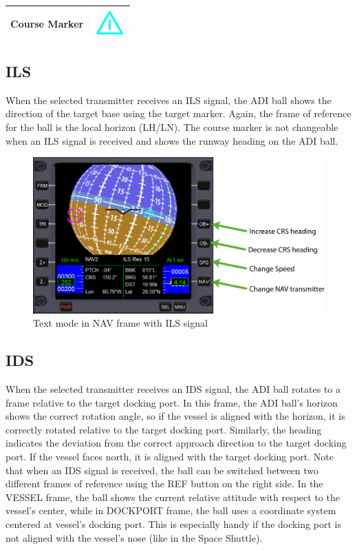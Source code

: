 \documentclass[paper=a4, 11 pt]{report}
\begin{document}
\renewcommand{\arraystretch}{2.7}
\begin{center}
\begin{tabular}{ |c  c | }
  \hline
  Course Marker & \includegraphics[scale=.5]{crs.png} \\ \hline
\end{tabular}
\end{center}

\subsection{ILS}
When the selected transmitter receives an ILS signal, the ADI ball shows the direction of the target base using the target marker.
Again, the frame of reference for the ball is the local horizon (LH/LN).
The course marker is not changeable when an ILS signal is received and shows the runway heading on the ADI ball.

\begin{figure}[h]
	\centering
	\includegraphics[width=\textwidth]{3_ils.pdf}
	\caption{Text mode in NAV frame with ILS signal}
	\label{fig:ils}
\end{figure}

\subsection{IDS}
When the selected transmitter receives an IDS signal, the ADI ball rotates to a frame relative to the target docking port.
In this frame, the ADI ball's horizon shows the correct rotation angle, so if the vessel is aligned with the horizon, it is correctly rotated relative to the target docking port.
Similarly, the heading indicates the deviation from the correct approach direction to the target docking port.
If the vessel faces north, it is aligned with the target docking port.
Note that when an IDS signal is received, the ball can be switched between two different frames of reference using the REF button on the right side.
In the VESSEL frame, the ball shows the current relative attitude with respect to the vessel's center, while in DOCKPORT frame, the ball uses a coordinate system centered at vessel's docking port.
This is especially handy if the docking port is not aligned with the vessel's nose (like in the Space Shuttle).
\end{document}
